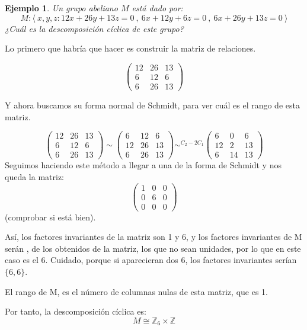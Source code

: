 \documentclass[11pt, a4paper, titlepage]{article}
\makeatletter
\renewenvironment{proof}[1][\proofname] {\vspace{-15pt}\par\pushQED{\qed}\normalfont\topsep6\p@\@plus6\p@\relax\trivlist\item[\hskip\labelsep\it#1\@addpunct{.}]\ignorespaces}{\popQED\endtrivlist\@endpefalse}
\providecommand{\ent}{\mathbb{Z}}
\theoremstyle{theorem-style}
\theoremstyle{definition-style}
\theoremstyle{remark-style}
\theoremstyle{example-style}
\newtheorem*{ejemplo}{Ejemplo}
\makeatother
\begin{document}
\begin{ejemplo}
	Un grupo abeliano $M$ está dado por:
	\[
	M: \langle \ x,y,z :  12x+26y+13z = 0  \ , \ 6x+12y+6z = 0 \ , \ 6x+26y+13z = 0 \ \rangle
	\]
	¿Cuál es la descomposición cíclica de este grupo?
\end{ejemplo}
\begin{proof}[Solución]
	Lo primero que habría que hacer es construir la matriz de relaciones.
	
	\[
	\begin{pmatrix}
 12 & 26 & 13 \\
 6 & 12 & 6 \\
 6 & 26 & 13 
\end{pmatrix} 
	\]
	
	Y ahora buscamos su forma normal de Schmidt, para ver cuál es el rango de esta matriz.
	
	\[
	\begin{pmatrix}
 12 & 26 & 13 \\
 6 & 12 & 6 \\
 6 & 26 & 13 
\end{pmatrix} \sim
\begin{pmatrix}
 6 & 12 & 6 \\
 12 & 26 & 13 \\
 6 & 26 & 13 
\end{pmatrix} \sim^{C_2 - 2C_1}
\begin{pmatrix}
 6 & 0 & 6 \\
 12 & 2 & 13 \\
 6 & 14& 13 
\end{pmatrix} 
	\] 
	Seguimos haciendo este método a llegar a una de la forma de Schmidt y nos queda la matriz:
	\[
	\begin{pmatrix}
 1 & 0 & 0 \\
 0 & 6 & 0 \\
 0 & 0 & 0 
\end{pmatrix} 
	\]
	(comprobar si está bien).
	
	Así, los factores invariantes de la matriz son 1 y 6, y los factores invariantes de M serán , de los obtenidos de la matriz, los que no sean unidades, por lo que en este caso es el 6. Cuidado, porque si aparecieran dos 6, los factores invariantes serían $\{6,6\}$. 
	
	El rango de M, es el número de columnas nulas de esta matriz, que es 1. 
	
	Por tanto, la descomposición cíclica es:
	\[
	M \cong \ent_6 \times \ent
	\]
\end{proof}
\end{document}
